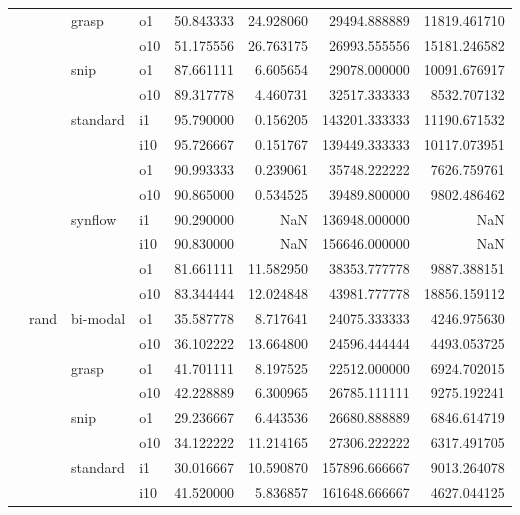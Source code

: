 \begin{longtable}{llllrrrr}
      &     & grasp & o1 &  50.843333 &  24.928060 &     29494.888889 &  11819.461710 \\
      &     &         & o10 &  51.175556 &  26.763175 &     26993.555556 &  15181.246582 \\
      &     & snip & o1 &  87.661111 &   6.605654 &     29078.000000 &  10091.676917 \\
      &     &         & o10 &  89.317778 &   4.460731 &     32517.333333 &   8532.707132 \\
      &     & standard & i1 &  95.790000 &   0.156205 &    143201.333333 &  11190.671532 \\
      &     &         & i10 &  95.726667 &   0.151767 &    139449.333333 &  10117.073951 \\
      &     &         & o1 &  90.993333 &   0.239061 &     35748.222222 &   7626.759761 \\
      &     &         & o10 &  90.865000 &   0.534525 &     39489.800000 &   9802.486462 \\
      &     & synflow & i1 &  90.290000 &        NaN &    136948.000000 &           NaN \\
      &     &         & i10 &  90.830000 &        NaN &    156646.000000 &           NaN \\
      &     &         & o1 &  81.661111 &  11.582950 &     38353.777778 &   9887.388151 \\
      &     &         & o10 &  83.344444 &  12.024848 &     43981.777778 &  18856.159112 \\
      & rand & bi-modal & o1 &  35.587778 &   8.717641 &     24075.333333 &   4246.975630 \\
      &     &         & o10 &  36.102222 &  13.664800 &     24596.444444 &   4493.053725 \\
      &     & grasp & o1 &  41.701111 &   8.197525 &     22512.000000 &   6924.702015 \\
      &     &         & o10 &  42.228889 &   6.300965 &     26785.111111 &   9275.192241 \\
      &     & snip & o1 &  29.236667 &   6.443536 &     26680.888889 &   6846.614719 \\
      &     &         & o10 &  34.122222 &  11.214165 &     27306.222222 &   6317.491705 \\
      &     & standard & i1 &  30.016667 &  10.590870 &    157896.666667 &   9013.264078 \\
      &     &         & i10 &  41.520000 &   5.836857 &    161648.666667 &   4627.044125 \\

\end{longtable}
